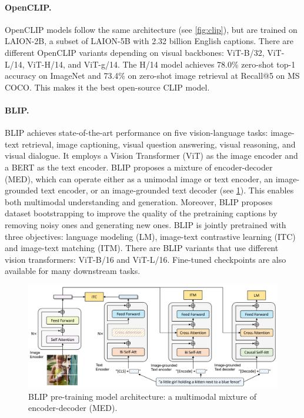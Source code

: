 \paragraph{OpenCLIP.} OpenCLIP \cite{ilharco_gabriel_2021_5143773} models follow the same architecture (see \cref{fig:clip}), but are trained on LAION-2B, a subset of LAION-5B \cite{schuhmann2022laionb} with 2.32 billion English captions. There are different OpenCLIP variants depending on visual backbones: ViT-B/32, ViT-L/14, ViT-H/14, and ViT-g/14. The H/14 model achieves 78.0\% zero-shot top-1 accuracy on ImageNet and 73.4\% on zero-shot image retrieval at Recall@5 on MS COCO. This makes it the best open-source CLIP model.

\paragraph{BLIP.} BLIP \cite{li2022blip} achieves state-of-the-art performance on five vision-language tasks: image-text retrieval, image captioning, visual question answering, visual reasoning, and visual dialogue. It employs a Vision Transformer (ViT) \cite{dosovitskiy2020imageworth} as the image encoder and a BERT as the text encoder. BLIP proposes a mixture of encoder-decoder (MED), which can operate either as a unimodal image or text encoder, an image-grounded text encoder, or an image-grounded text decoder (see \cref{fig:blip}). This enables both multimodal understanding and generation. Moreover, BLIP proposes dataset bootstrapping to improve the quality of the pretraining captions by removing noisy ones and generating new ones. BLIP is jointly pretrained with three objectives: language modeling (LM), image-text contrastive learning (ITC) and image-text matching (ITM). There are BLIP variants that use different vision transformers: ViT-B/16 and ViT-L/16. Fine-tuned checkpoints are also available for many downstream tasks.

\begin{figure}[ht]
    \centering
    \includegraphics[width=\linewidth]{images/models/blip.png}
    \caption{BLIP pre-training model architecture: a multimodal mixture
of encoder-decoder (MED).}
    \label{fig:blip}
\end{figure}


